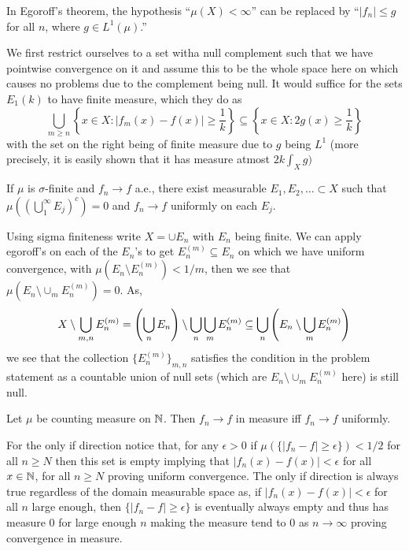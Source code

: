\documentclass[12pt,a4paper]{article}
\begin{document}
\begin{problem}\label{prob:2-40}
In Egoroff's theorem, the hypothesis ``$\mu(X) < \infty$'' can be replaced by ``$|f_n| \le g$ for all $n$, where $g \in L^1(\mu)$.''
\end{problem}
\begin{solution}
We first restrict ourselves to a set witha null complement such that we have pointwise convergence on it and assume this to be the whole space here on which causes no problems due to the complement being null. It would suffice for the sets $E_{1}(k)$ to have finite measure, which they do as
\[
	\bigcup_{m\geq n}\left\{x\in X:|f_m(x)-f(x)|\geq \frac{1}{k}\right\}\subseteq\left\{x\in X:2g(x)\geq \frac{1}{k}\right\}
\]
with the set on the right being of finite measure due to $g$ being $L^1$ (more precisely, it is easily shown that it has measure atmost $2k\int_Xg)$
\end{solution}
\begin{problem}\label{prob:2-41}
If $\mu$ is $\sigma$-finite and $f_n \to f$ a.e., there exist measurable $E_1, E_2, \ldots \subset X$ such that $\mu( (\bigcup_1^\infty E_j)^c ) = 0$ and $f_n \to f$ uniformly on each $E_j$.
\end{problem}
\begin{solution}
Using sigma finiteness write $X=\cup E_n$ with $E_n$ being finite. 
We can apply egoroff's on each of the $E_n$'s to get $E_{n}^{(m)}\subseteq E_n$ on which we have uniform convergence, with $\mu(E_n\setminus E_n^{(m)})<1/m$, then we see that $\mu(E_n\setminus\cup_mE_n^{(m)})=0$. 
As,
\[
	X\setminus\bigcup_{m,n}E_n^{(m)}=\qty(\bigcup_n E_n)\setminus\bigcup_n\bigcup_m E_n^{(m)}\subseteq\bigcup_n\qty(E_n\setminus\bigcup_m E_n^{(m)})
\]
we see that the collection $\{E_n^{(m)}\}_{m,n}$ satisfies the condition in the problem statement as a countable union of null sets (which are $E_n\setminus\cup_mE_n^{(m)}$ here) is still null.
\end{solution}
\begin{problem}\label{prob:2-42}
Let $\mu$ be counting measure on $\mathbb{N}$. Then $f_n \to f$ in measure iff $f_n \to f$ uniformly.
\end{problem}
\begin{solution}
	For the only if direction notice that, for any $\epsilon>0$ if $\mu(\{|f_n-f|\geq\epsilon\})<1/2$ for all $n\geq N$ then this set is empty implying that $|f_n(x)-f(x)|<\epsilon$ for all $x\in\mathbb{N}$, for all $n\geq N$ proving uniform convergence.
	The only if direction is always true regardless of the domain measurable space as, if $|f_n(x)-f(x)|<\epsilon$ for all $n$ large enough, then $\{|f_n-f|\geq\epsilon\}$ is eventually always empty and thus has measure $0$ for large enough $n$ making the measure tend to $0$ as $n\to\infty$ proving convergence in measure. 
\end{solution}
\end{document}
